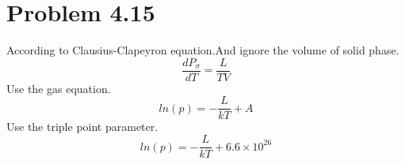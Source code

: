 \documentclass{article}
\begin{document}
\section*{Problem 4.15} %
\label{sec:problem_4_15}
	

	According to Clausius-Clapeyron equation.And ignore the volume of solid phase.
	$$\frac{dP_{\sigma}}{dT}=\frac{L}{TV}$$
	Use the gas equation.
	$$ln(p)=-\frac{L}{kT}+A$$
	Use the triple point parameter.
	$$ln(p)=-\frac{L}{kT}+6.6\times10^{26}$$
\end{document}
